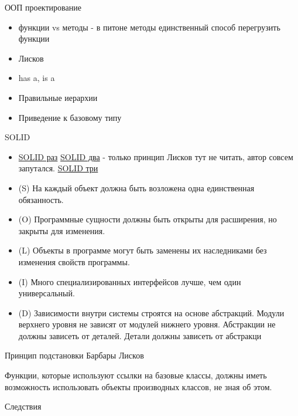 \documentclass{article}
\begin{document}
\LARGE

\begin{center} ООП проектирование  \end{center}
\begin{itemize}
    \item функции vs методы - в питоне методы единственный способ перегрузить функции
    \item Лисков
    \item has a, is a
    \item Правильные иерархии
    \item Приведение к базовому типу
\end{itemize}
\newpage

\begin{center} SOLID \end{center}
\begin{itemize}
	\item 	\href{http://ru.wikipedia.org/wiki/SOLID_(%D0%BE%D0%B1%D1%8A%D0%B5%D0%BA%D1%82%D0%BD%D0%BE-%D0%BE%D1%80%D0%B8%D0%B5%D0%BD%D1%82%D0%B8%D1%80%D0%BE%D0%B2%D0%B0%D0%BD%D0%BD%D0%BE%D0%B5_%D0%BF%D1%80%D0%BE%D0%B3%D1%80%D0%B0%D0%BC%D0%BC%D0%B8%D1%80%D0%BE%D0%B2%D0%B0%D0%BD%D0%B8%D0%B5)}{SOLID раз}
    	\href{http://blog.byndyu.ru/2009/10/solid.html}{SOLID два} - только принцип Лисков тут не читать, автор совсем запутался.
    	\href{http://igor.quatrocode.com/2008/09/solid-top-5.html}{SOLID три}
    \item (S) На каждый объект должна быть возложена одна единственная обязанность.
    \item (O) Программные сущности должны быть открыты для расширения, но закрыты для изменения.
    \item (L) Объекты в программе могут быть заменены их наследниками без изменения свойств программы. 
    \item (I) Много специализированных интерфейсов лучше, чем один универсальный.
    \item (D) Зависимости внутри системы строятся на основе абстракций. 
    		  Модули верхнего уровня не зависят от модулей нижнего уровня. Абстракции не должны
    		  зависеть от деталей. Детали должны зависеть от абстракци
\end{itemize}
\newpage

\begin{center} Принцип подстановки Барбары Лисков \end{center}
    Функции, которые используют ссылки на базовые классы, должны 
    иметь возможность использовать объекты производных классов, не зная об этом.
\begin{center} Следствия \end{center}
\end{document}
